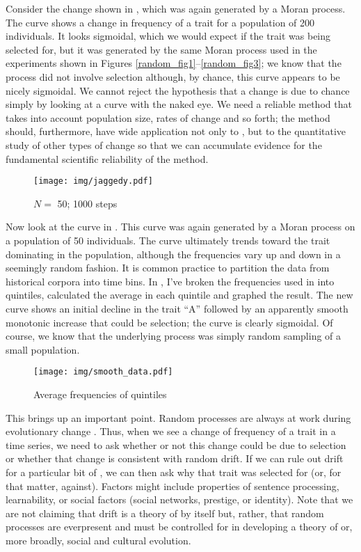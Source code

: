 \documentclass[output=paper]{langsci/langscibook}
\begin{document}
Consider the change shown in , which was again
generated by a Moran process.  The curve shows a change in frequency
of a trait for a population of 200 individuals. It looks sigmoidal,
which we would expect if the trait was being selected for, but it was
generated by the same Moran process used in the experiments shown in
Figures \ref{random_fig1}--\ref{random_fig3}; we know that the process
did not involve selection although, by chance, this curve appears to
be nicely sigmoidal.  We cannot reject the hypothesis that a change is
due to chance simply by looking at a curve with the naked eye.  We
need a reliable method that takes into account population size, rates
of change and so forth; the method should, furthermore, have wide
application not only to , but to the quantitative study
of other types of change so that we can accumulate evidence for the
fundamental scientific reliability of the method.

\begin{figure}
  \texttt{[image: img/jaggedy.pdf]}
  \caption{$N=$ \num{50}; \num{1000} steps\label{jaggedy}}
\end{figure}

Now look at the curve in .  This curve was again
generated by a Moran process on a population of 50 individuals.  The
curve ultimately trends toward the trait dominating in the population,
although the frequencies vary up and down in a seemingly random
fashion.  It is common practice to partition the data from historical
corpora into time bins.  In , I've broken the
frequencies used in  into quintiles, calculated
the average in each quintile and graphed the result.  The new curve
shows an initial decline in the trait ``A'' followed by an apparently
smooth monotonic increase that could be selection; the curve is
clearly sigmoidal.  Of course, we know that the underlying process was
simply random sampling of a small population.

\begin{figure}
  \texttt{[image: img/smooth\_data.pdf]}
  \caption{Average frequencies of quintiles\label{smoothed}}
\end{figure}


This brings up an important point.  Random processes are always at
work during evolutionary change \citep{kimura:1983}.  Thus, when we
see a change of frequency of a trait in a time series, we need to ask
whether or not this change could be due to selection or whether that
change is consistent with random drift.  If we can rule out drift for
a particular bit of , we can then ask why that trait
was selected for (or, for that matter, against).  Factors might
include properties of sentence processing, learnability, or social
factors (social networks, prestige, or identity).  Note that we are
not claiming that drift is a theory of  by itself but,
rather, that random processes are everpresent and must be controlled
for in developing a theory of  or, more broadly, social
and cultural evolution.
\end{document}
